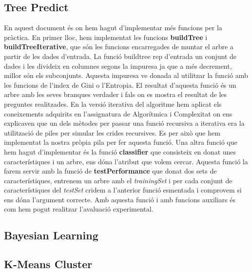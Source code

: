 \documentclass[11pt]{article}
\begin{document}
	\subsection{Tree Predict}
		En aquest document és on hem hagut d'implementar més funcions per la pràctica. En primer lloc, hem implementat les funcions \textbf{buildTree} i \textbf{buildTreeIterative}, que són les funcions encarregades de muntar el arbre a partir de les dades d'entrada. La funció buildtree rep d'entrada un conjunt de dades i les divideix en columnes segons la impuresa ja que a més decrement, millor són els subconjunts. Aquesta impuresa ve donada al utilitzar la funció amb les funcions de l'index de Gini o l'Entropia. El resultat d'aquesta funció és un arbre amb les seves branques verdader i fals on es mostra el resultat de les preguntes realitzades. En la versió iterativa del algoritme hem aplicat els coneixements adquirits en l'assignatura de Algorítmica i Complexitat on ens explicaven que un dels mètodes per passar una funció recursiva a iterativa era la utilització de piles per simular les crides recursives. Es per això que hem implementat la nostra pròpia pila per fer aquesta funció. Una altra funció que hem hagut d'implementar és la funció \textbf{classifier} que consisteix en donat unes característiques i un arbre, ens dóna l'atribut que volem cercar. Aquesta funció la farem servir amb la funció de \textbf{testPerformance} que donat dos sets de característiques, entrenem un arbre amb el \textit{trainingSet} i per cada conjunt de característiques del \textit{testSet} cridem a l'anterior funció esmentada i comprovem si ens dóna l'argument correcte. Amb aquesta funció i amb funcions auxiliars és com hem pogut realitzar l'avaluació experimental.
		
	\subsection{Bayesian Learning}
		
	\subsection{K-Means Cluster}
\end{document}
